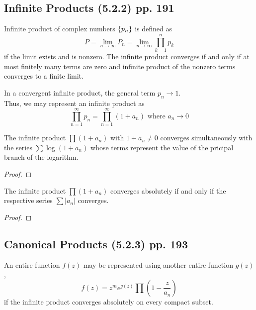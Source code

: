 \subsection{Infinite Products (5.2.2) pp. 191}
\begin{definition}
	Infinite product of complex numbers $\left\{p_n\right\}$ is defined as
	\begin{equation}
		P = \lim_{n \to \infty} P_n = \lim_{n \to \infty} \prod_{k=1}^n p_k
	\end{equation}
	if the limit exists and is nonzero. The infinite product converges if and only if at most finitely many terms are zero and infinite product of the nonzero terms converges to a finite limit.	
\end{definition}

\begin{remark}
	In a convergent infinite product, the general term $p_n \to 1$.\\
	Thus, we may represent an infinite product as
	\[ \prod_{n=1}^\infty p_n = \prod_{n = 1}^\infty (1+a_n) \text{ where } a_n \to 0 \]
\end{remark}

\begin{theorem}
	The infinite product $\prod (1+a_n)$ with $1+a_n \ne 0$ converges simultaneously with the series $\sum \log (1+a_n)$ whose terms represent the value of the pricipal branch of the logarithm.
\end{theorem}
\begin{proof}
\end{proof}

\begin{theorem}
	The infinite product $\prod (1+a_n)$ converges absolutely if and only if the respective series $\sum |a_n|$ converges.
\end{theorem}
\begin{proof}
\end{proof}

\subsection{Canonical Products (5.2.3) pp. 193}
\begin{remark}
	An entire function $f(z)$ may be represented using another entire function $g(z)$, 
	\begin{equation}
		f(z) = z^m e^{g(z)} \prod(1-\frac{z}{a_n})
	\end{equation}
	if the infinite product converges absolutely on every compact subset.
\end{remark}

